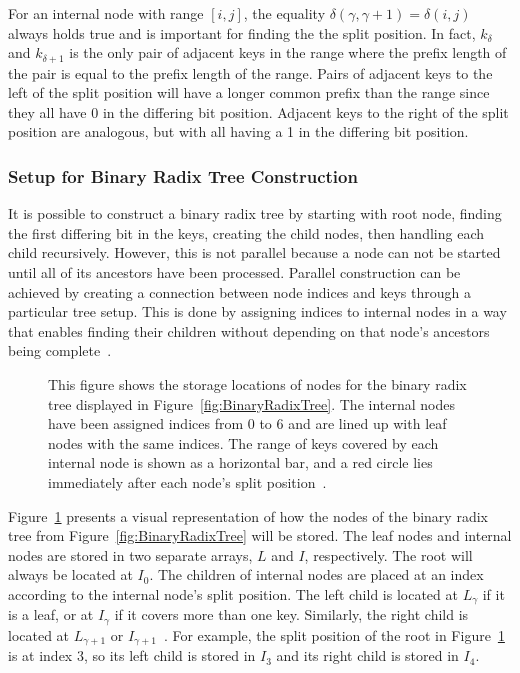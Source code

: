 \documentclass{sig-alternate}
\begin{document}
For an internal node with range $[i,j]$, the equality $\delta(\gamma,\gamma+1) = \delta(i,j)$ always holds true and is important for finding the the split position. In fact, $k_{\delta}$ and $k_{\delta+1}$ is the only pair of adjacent keys in the range where the prefix length of the pair is equal to the prefix length of the range. Pairs of adjacent keys to the left of the split position will have a longer common prefix than the range since they all have 0 in the differing bit position. Adjacent keys to the right of the split position are analogous, but with all having a 1 in the differing bit position.

\subsubsection{Setup for Binary Radix Tree Construction}
\label{sec:setup}

It is possible to construct a binary radix tree by starting with root node, finding the first differing bit in the keys, creating the child nodes, then handling each child recursively. However, this is not parallel because a node can not be started until all of its ancestors have been processed. Parallel construction can be achieved by creating a connection between node indices and keys through a particular tree setup. This is done by assigning indices to internal nodes in a way that enables finding their children without depending on that node's ancestors being complete~\cite{Karras:2012}.

\begin{figure}
\centering
{}
\caption{This figure shows the storage locations of nodes for the binary radix tree displayed in Figure~\ref{fig:BinaryRadixTree}. The internal nodes have been assigned indices from 0 to 6 and are lined up with leaf nodes with the same indices. The range of keys covered by each internal node is shown as a horizontal bar, and a red circle lies immediately after each node's split position~\cite{Karras:2012}.}
\label{fig:BinaryRadixArrays}
\end{figure}

Figure~\ref{fig:BinaryRadixArrays} presents a visual representation of how the nodes of the binary radix tree from Figure~\ref{fig:BinaryRadixTree} will be stored. The leaf nodes and internal nodes are stored in two separate arrays, $L$ and $I$, respectively. The root will always be located at $I_{0}$. The children of internal nodes are placed at an index according to the internal node's split position. The left child is located at $L_{\gamma}$ if it is a leaf, or at $I_{\gamma}$ if it covers more than one key. Similarly, the right child is located at $L_{\gamma+1}$ or $I_{\gamma+1}$~\cite{Karras:2012}. For example, the split position of the root in Figure~\ref{fig:BinaryRadixArrays} is at index 3, so its left child is stored in $I_{3}$ and its right child is stored in $I_{4}$.
\end{document}
